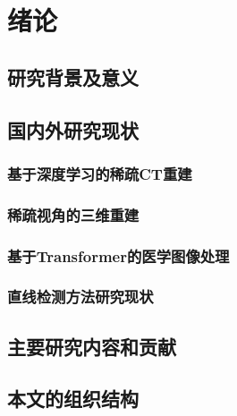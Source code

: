 
\chapter{绪论}

\section{研究背景及意义}

\section{国内外研究现状}
\subsection{基于深度学习的稀疏CT重建}

\subsection{稀疏视角的三维重建}

\subsection{基于Transformer的医学图像处理}

\subsection{直线检测方法研究现状}

\section{主要研究内容和贡献}

\section{本文的组织结构}

